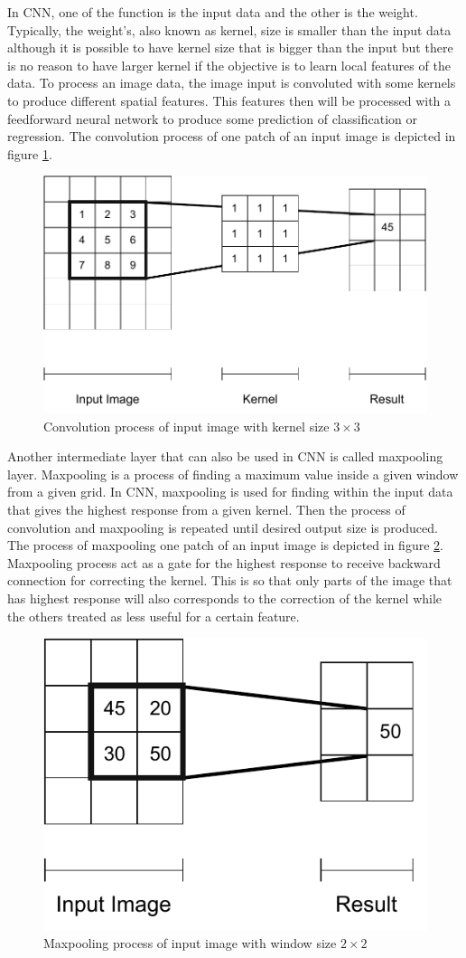     In CNN, one of the function is the input data and the other is the
    weight. Typically, the weight's, also known as kernel, size is
    smaller than the input data although it is possible to have kernel
    size that is bigger than the input but there is no reason to have
    larger kernel if the objective is to learn local features of the
    data. To process an image data, the image input is convoluted with
    some kernels to produce different spatial features. This features
    then will be processed with a feedforward neural network to
    produce some prediction of classification or regression. The
    convolution process of one patch of an input image is depicted in
    figure \ref{fig:convolution}.
    \begin{figure}
        \centering
        \includegraphics[width=.6\linewidth]{images/convolution.pdf}
        \caption{Convolution process of input image with kernel size $3\times3$}
        \label{fig:convolution}
    \end{figure}
    
    Another intermediate layer that can also be used in CNN is called
    maxpooling layer. Maxpooling is a process of finding a maximum
    value inside a given window from a given grid. In CNN, maxpooling
    is used for finding within the input data that gives the highest
    response from a given kernel. Then the process of convolution and
    maxpooling is repeated until desired output size is produced. The
    process of maxpooling one patch of an input image is depicted in figure
    \ref{fig:maxpool}. Maxpooling process act as a gate for the
    highest response to receive backward connection for correcting the
    kernel. This is so that only parts of the image that has highest
    response will also corresponds to the correction of the kernel
    while the others treated as less useful for a certain feature. 
    \begin{figure}
        \centering
        \includegraphics[width=.35\linewidth]{images/maxpool.pdf}
        \caption{Maxpooling process of input image with window size $2\times2$}
        \label{fig:maxpool}
    \end{figure}

